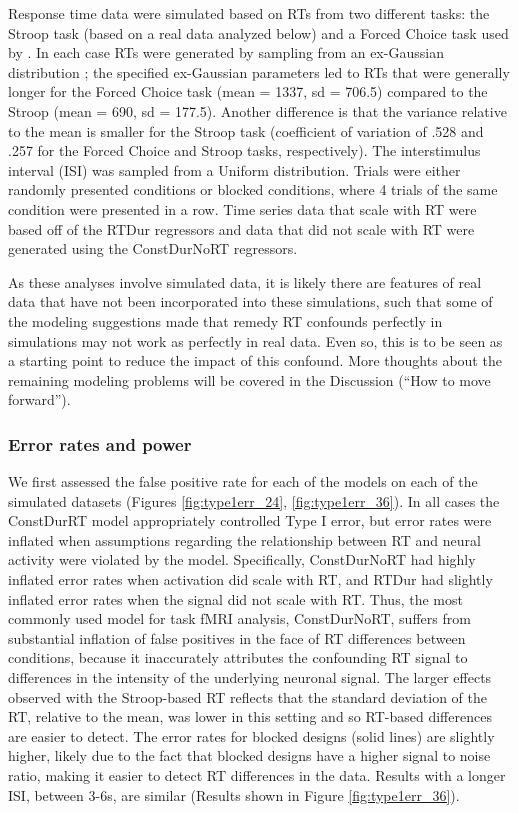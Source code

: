 \documentclass[titlepage,12pt] {article}
\begin{document}
Response time data were simulated based on RTs from two different tasks: the Stroop task (based on a real data analyzed below) and a Forced Choice task used by \citet{grinband_detection_2008}.  In each case RTs were generated by sampling from an ex-Gaussian distribution \citep{Ratcliff1976RetrievalPI}; the specified ex-Gaussian parameters led to RTs that were generally longer for the Forced Choice task (mean = 1337, sd = 706.5) compared to the Stroop (mean = 690, sd = 177.5).  Another difference is that the variance relative to the mean is smaller for the Stroop task (coefficient of variation of .528 and .257 for the Forced Choice and Stroop tasks, respectively).   The interstimulus interval (ISI) was sampled from a Uniform distribution. Trials were either randomly presented conditions or blocked conditions, where 4 trials of the same condition were presented in a row.  Time series data that scale with RT were based off of the RTDur regressors and data that did not scale with RT were generated using the ConstDurNoRT regressors. 

As these analyses involve simulated data, it is likely there are features of real data that have not been incorporated into these simulations, such that some of the modeling suggestions made that remedy RT confounds perfectly in simulations may not work as perfectly in real data.  Even so, this is to be seen as a starting point to reduce the impact of this confound.  More thoughts about the remaining modeling problems will be covered in the Discussion (``How to move forward'').

\subsubsection*{Error rates and power}

We first assessed the false positive rate for each of the models on each of the simulated datasets (Figures \ref{fig:type1err_24}, \ref{fig:type1err_36}).  In all cases the ConstDurRT model appropriately controlled Type I error, but error rates were inflated when assumptions regarding the relationship between RT and neural activity were violated by the model.  Specifically, ConstDurNoRT had highly inflated error rates when activation did scale with RT, and RTDur had slightly inflated error rates when the signal did not  scale with RT.  Thus, the most commonly used model for task fMRI analysis, ConstDurNoRT, suffers from substantial inflation of false positives in the face of RT differences between conditions, because it inaccurately attributes the confounding RT signal to differences in the intensity of the underlying neuronal signal.  The larger effects observed with the Stroop-based RT reflects that the standard deviation of the RT, relative to the mean, was lower in this setting and so RT-based differences are easier to detect. The error rates for blocked designs (solid lines) are slightly higher, likely due to the fact that blocked designs have a higher signal to noise ratio, making it easier to detect RT differences in the data.  Results with a longer ISI, between 3-6s, are similar (Results shown in Figure \ref{fig:type1err_36}).
\end{document}
